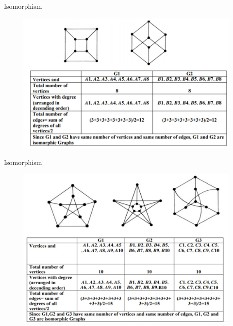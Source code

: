 \documentclass{beamer}
\begin{document}
\begin{frame}{{Isomorphism}}
	
	\begin{figure}
		\includegraphics[scale=.4]{img/m40}
	\end{figure}
	
\end{frame}
\begin{frame}{{Isomorphism}}
	
	\begin{figure}
		\includegraphics[scale=.4]{img/m41}
	\end{figure}
	
\end{frame}
\end{document}
